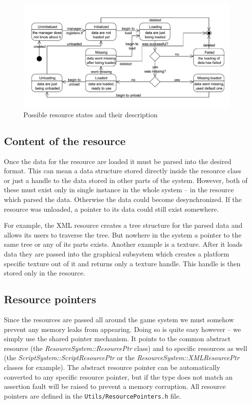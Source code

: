 \documentclass[a4paper, 12pt]{report}
\begin{document}
\begin{figure}[htbp]
	\centering
		\includegraphics[width=1\textwidth]{ResourceStates.pdf}
	\caption[Possible resource states]{Possible resource states and their description}
	\label{fig:resource-states}
\end{figure}

\subsection{Content of the resource}

Once the data for the resource are loaded it must be parsed into the desired format. This can mean a data structure stored directly inside the resource class or just a handle to the data stored in other parts of the system. However, both of these must exist only in single instance in the whole system -- in the resource which parsed the data. Otherwise the data could become desynchronized. If the resource was unloaded, a pointer to its data could still exist somewhere. 

For example, the XML resource creates a tree structure for the parsed data and allows its users to traverse the tree. But nowhere in the system a pointer to the same tree or any of its parts exists. Another example is a texture. After it loads data they are passed into the graphical subsystem which creates a platform specific texture out of it and returns only a texture handle. This handle is then stored only in the resource.

\subsection{Resource pointers}

Since the resources are passed all around the game system we must somehow prevent any memory leaks from appearing. Doing so is quite easy however -- we simply use the shared pointer mechanism. It points to the common abstract resource (the \emph{ResourceSystem::ResourcePtr} class) and to specific resources as well (the \emph{ScriptSystem::ScriptResourcePtr} or the \emph{ResourceSystem::XMLResourcePtr} classes for example). The abstract resource pointer can be automatically converted to any specific resource pointer, but if the type does not match an assertion fault will be raised to prevent a memory corruption. All resource pointers are defined in the \verb'Utils/ResourcePointers.h' file.
\end{document}
